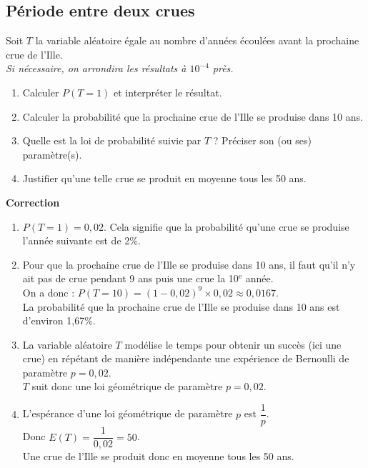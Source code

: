 \documentclass[a4paper,11pt,exos]{nsi} %
\begin{document}
\subsection*{Période entre deux crues}
Soit $T$ la variable aléatoire égale au nombre d'années écoulées avant la prochaine crue de l'Ille.\\ 
\textit{Si nécessaire, on arrondira les résultats à $10^{-4}$ près.}
\begin{enumerate}
    \item Calculer $P(T=1)$ et interpréter le résultat.
    \item Calculer la probabilité que la prochaine crue de l'Ille se produise dans 10 ans.
    \item Quelle est la loi de probabilité suivie par $T$ ? Préciser son (ou ses) paramètre(s).
    \item Justifier qu'une telle crue se produit en moyenne tous les 50 ans.
\end{enumerate}

\textcolor{UGLiBlue}{\textbf{Correction}
\begin{enumerate}
    \item $P(T=1)=0,02$. Cela signifie que la probabilité qu'une crue se produise l'année suivante est de 2\%.
    \item Pour que la prochaine crue de l'Ille se produise dans 10 ans, il faut qu'il n'y ait pas de crue pendant 9 ans puis une crue la 10$^\text{e}$ année.\\
    On a donc : $P(T= 10)=(1-0,02)^9\times 0,02\approx0,0167$.\\
    La probabilité que la prochaine crue de l'Ille se produise dans 10 ans est d'environ 1,67\%.
    \item La variable aléatoire $T$ modélise le temps pour obtenir un succès (ici une crue) en répétant de manière indépendante une expérience de Bernoulli de paramètre $p=0,02$.\\
    $T$ suit donc une loi géométrique de paramètre $p=0,02$.
    \item L'espérance d'une loi géométrique de paramètre $p$ est $\dfrac{1}{p}$.\\
    Donc $E(T)=\dfrac{1}{0,02}=50$.\\
    Une crue de l'Ille se produit donc en moyenne tous les 50 ans.
\end{enumerate}
}
\end{document}
